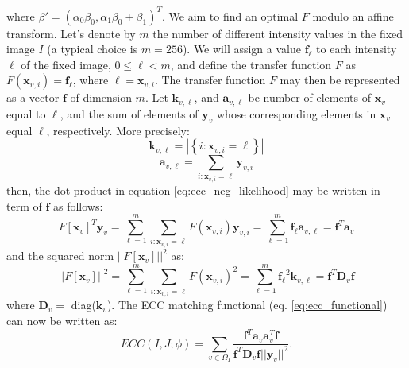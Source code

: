 where $\beta' = (\alpha_{0}\beta_{0}, \alpha_{1}\beta_{0} + \beta_{1})^{T}$. We aim to find an optimal $F$ modulo an affine transform. Let's denote by $m$ the number of different intensity values in the fixed image $I$ (a typical choice is $m=256$). We will assign a value $\mathbf{f}_{\ell}$ to each intensity $\ell$ of the fixed image, $0\leq \ell < m$, and define the transfer function $F$ as $F(\mathbf{x}_{v,i}) = \mathbf{f}_{\ell}$, where $\ell = \mathbf{x}_{v,i}$. The transfer function $F$ may then be represented as a vector $\mathbf{f}$ of dimension $m$. Let $\mathbf{k}_{v,\ell}$, and $\mathbf{a}_{v,\ell}$ be number of elements of $\mathbf{x}_{v}$ equal to $\ell$, and the sum of elements of $\mathbf{y}_{v}$ whose corresponding elements in $\mathbf{x}_{v}$ equal $\ell$, respectively. More precisely:
\begin{displaymath}
    \mathbf{k}_{v,\ell} = |\left\lbrace i : \mathbf{x}_{v,i}=\ell \right\rbrace|
\end{displaymath}
\begin{displaymath}
    \mathbf{a}_{v, \ell} = \sum_{i:\mathbf{x}_{v,i}=\ell} \mathbf{y}_{v,i}
\end{displaymath}
then, the dot product in equation \eqref{eq:ecc_neg_likelihood} may be written in term of $\mathbf{f}$ as follows:
\begin{displaymath}
    F\left[\mathbf{x}_{v}\right]^{T} \mathbf{y}_{v} = \sum_{\ell=1}^{m} \sum_{i:\mathbf{x}_{v,i}=\ell} F(\mathbf{x}_{v,i})\mathbf{y}_{v,i}
    =\sum_{\ell=1}^{m} \mathbf{f_{\ell}}\mathbf{a}_{v, \ell} = \mathbf{f}^{T}\mathbf{a}_{v}
\end{displaymath}
and the squared norm $||F[\mathbf{x}_{v}]||^{2}$ as:
\begin{displaymath}
    ||F\left[\mathbf{x}_{v}\right]||^{2} = \sum_{\ell=1}^{m} \sum_{i:\mathbf{x}_{v,i}=\ell} F(\mathbf{x}_{v,i})^{2}
    = \sum_{\ell=1}^{m} \mathbf{f_{\ell}}^{2} \mathbf{k}_{v, \ell} = \mathbf{f}^{T} \mathbf{D}_{v} \mathbf{f}
\end{displaymath}
where $\mathbf{D}_{v} = $ diag($\mathbf{k}_{v}$). The ECC matching functional (eq. \eqref{eq:ecc_functional}) can now be written as:
\begin{equation}\label{eq:ecc_neg_likelihood_vector_form}
    ECC(I, J;\phi) = \sum_{v\in\Omega_{I}}\frac{\mathbf{f}^{T}\mathbf{a}_{v}\mathbf{a}_{v}^{T}\mathbf{f}}
    {\mathbf{f}^{T} \mathbf{D}_{v} \mathbf{f}||\mathbf{y}_{v}||^{2}}.
\end{equation}

